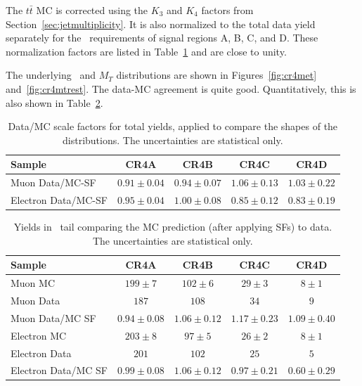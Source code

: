 The $t\bar{t}$ MC is corrected using the $K_3$ and $K_4$ factors
from Section~\ref{sec:jetmultiplicity}.  It is also normalized to the 
total data yield separately for the \met\ requirements of signal
regions A, B, C, and D.  These normalization factors are listed
in Table~\ref{tab:cr4mtsf} and are close to unity.

The underlying \met\ and $M_T$ distributions are shown in 
Figures~\ref{fig:cr4met} and~\ref{fig:cr4mtrest}.  The data-MC agreement
is quite good.  Quantitatively, this is also shown in Table~\ref{tab:cr4yields}.


\begin{table}[!h]
\begin{center}
\begin{tabular}{l||c|c|c|c}
\hline
Sample              & CR4A & CR4B & CR4C & CR4D \\
\hline
\hline
Muon Data/MC-SF           & $0.91 \pm 0.04$ & $0.94 \pm 0.07$ & $1.06 \pm 0.13$ & $1.03 \pm 0.22$ \\
\hline
\hline
Electron Data/MC-SF       & $0.95 \pm 0.04$ & $1.00 \pm 0.08$ & $0.85 \pm 0.12$ & $0.83 \pm 0.19$ \\
\hline
\end{tabular}
\caption{ Data/MC scale factors for total yields, applied to compare
  the shapes of the distributions.
  The uncertainties are statistical only.
\label{tab:cr4mtsf}}
\end{center}
\end{table}


\begin{table}[!h]
\begin{center}
\begin{tabular}{l||c|c|c|c}
\hline
Sample              & CR4A & CR4B & CR4C & CR4D \\
\hline
\hline
Muon MC                   & $199 \pm 7$ & $102 \pm 6$ & $29 \pm 3$ & $8 \pm 1$ \\
Muon Data                 & $187$ & $108$ & $34$ & $9$ \\
\hline
Muon Data/MC SF           & $0.94 \pm 0.08$ & $1.06 \pm 0.12$ & $1.17 \pm 0.23$ & $1.09 \pm 0.40$ \\
\hline
\hline
Electron MC               & $203 \pm 8$ & $97 \pm 5$ & $26 \pm 2$ & $8 \pm 1$ \\
Electron Data             & $201$ & $102$ & $25$ & $5$ \\
\hline
Electron Data/MC SF       & $0.99 \pm 0.08$ & $1.06 \pm 0.12$ & $0.97 \pm 0.21$ & $0.60 \pm 0.29$ \\
\hline
\end{tabular}
\caption{ Yields in \mt\ tail comparing the MC prediction (after
  applying SFs) to data. The uncertainties are statistical only.
\label{tab:cr4yields}}
\end{center}
\end{table}

